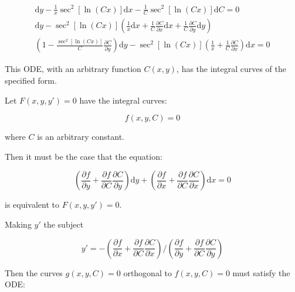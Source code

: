 \documentclass[12pt]{article}
\begin{document}
\begin{equation}
    \begin{split}
        \mathrm{d}y - \frac{1}{x} \sec^{2}{\left[ \ln{(Cx)} \right]} \mathrm{d}x - \frac{1}{C} \sec^{2}{\left[ \ln{(Cx)} \right]} \mathrm{d}C = 0 \\
        \mathrm{d}y - \sec^{2}{\left[ \ln{(Cx)} \right]} \left( \frac{1}{x} \mathrm{d}x  + \frac{1}{C} \frac{\partial C}{\partial x} \mathrm{d}x + \frac{1}{C} \frac{\partial C}{\partial y} \mathrm{d}y \right) \\
        \left( 1 - \frac{\sec^{2}{\left[ \ln{(Cx)} \right]}}{C} \frac{\partial C}{\partial y} \right) \mathrm{d}y - \sec^{2}{\left[ \ln{(Cx)} \right]} \left( \frac{1}{x} + \frac{1}{C} \frac{\partial C}{\partial x} \right) \mathrm{d}x = 0
    \end{split}
\end{equation}

This ODE, with an arbitrary function $C(x, y)$, has the integral curves of the specified form.


Let $F(x, y, y') = 0$ have the integral curves:

\begin{equation}
    f(x, y, C) = 0
\end{equation}

where $C$ is an arbitrary constant.

Then it must be the case that the equation:

\begin{equation}
    \left( \frac{\partial f}{\partial y} + \frac{\partial f}{\partial C} \frac{\partial C}{\partial y} \right) \mathrm{d}y + \left( \frac{\partial f}{\partial x} + \frac{\partial f}{\partial C} \frac{\partial C}{\partial x} \right) \mathrm{d}x = 0
\end{equation}

is equivalent to $F(x, y, y') = 0$.

Making $y'$ the subject

\begin{equation}
    y' = -\left( \frac{\partial f}{\partial x} + \frac{\partial f}{\partial C} \frac{\partial C}{\partial x} \right) / \left( \frac{\partial f}{\partial y} + \frac{\partial f}{\partial C} \frac{\partial C}{\partial y} \right)
\end{equation}

Then the curves $g(x, y, C) = 0$ orthogonal to $f(x, y, C) = 0$ must satisfy the ODE:
\end{document}
